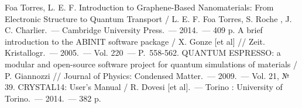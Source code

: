 \def\bibname{СПИСОК ИСПОЛЬЗОВАННЫХ ИСТОЧНИКОВ}
\begin{thebibliography}{99}
 Foa Torres, L. E. F. Introduction to Graphene-Based Nanomaterials: From Electronic Structure to Quantum Transport / L. E. F. Foa Torres, S. Roche , J. C. Charlier.~---
    Cambridge University Press.~--- 2014.~--- 409 p.
 A brief introduction to the ABINIT software package / X. Gonze [et al] // Zeit. Kristallogr.~--- 2005.~--- Vol. 220~--- P.~558-562.
 QUANTUM ESPRESSO: a modular and open-source software project for quantum simulations of materials / P. Giannozzi // Journal of Physics: Condensed Matter.~--- 2009.~--- Vol. 21, № 39.
 CRYSTAL14: User’s Manual / R. Dovesi [et al].~--- Torino : University of Torino.~--- 2014.~--- 382 p.
\end{thebibliography}
